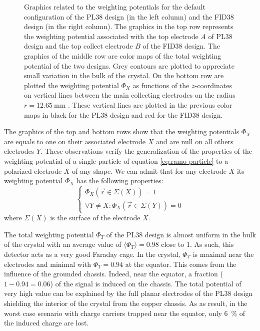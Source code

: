 \begin{figure}
\begin{minipage}{0.48\textwidth}
\end{minipage}
\caption{Graphics related to the weighting potentials for the default configuration of the PL38 design (in the left column) and the FID38 design (in the right column). The graphics in the top row represents the weighting potential associated with the top electrode $A$ of PL38 design and the top collect electrode $B$ of the FID38 design. The graphics of the middle row are color maps of the total weighting potential of the two designs. Grey contours are plotted to appreciate small variation in the bulk of the crystal. On the bottom row are plotted the weighting potential $\Phi_X$ as functions of the $z$-coordinates on vertical lines between the main collecting electrodes on the radius $r=\SI{12.65}{\mm}$ . These vertical lines are plotted in the previous color maps in black for the PL38 design and red for the FID38 design.}
\label{fig:pl38-fid38-weighting-potential}
\end{figure}

The graphics of the top and bottom rows show that the weighting potentials $\Phi_X$ are equals to one on their associated electrode $X$ and are null on all others electrodes $Y$. These observations verify the generalization of the properties of the weighting potential of a single particle of equation \ref{eq:ramo-particle} to a polarized electrode $X$ of any shape. We can admit that for any electrode $X$ its weighting potential $\Phi_X$ has the following properties:
\begin{equation}
\label{eq:ramo-electrode}
\begin{cases}
\Phi_X \left( \vec{r} \in \Sigma(X) \right) = 1 \\
\forall Y \neq X: \Phi_X \left( \vec{r} \in \Sigma(Y) \right) = 0
\end{cases}
\end{equation} 
where $\Sigma(X)$ is the surface of the electrode $X$.


The total weighting potential $\Phi_T$ of the PL38 design is almost uniform in the bulk of the crystal with an average value of $\langle \Phi_T \rangle = 0.98$ close to 1. As such, this detector acts as a very good Faraday cage. In the crystal, $\Phi_T$ is maximal near the electrodes and minimal with $\Phi_T = 0.94$ at the equator. This comes from the influence of the grounded chassis. Indeed, near the equator, a fraction ($1-0.94=0.06$) of the signal is induced on the chassis. The total potential of very high value can be explained by the full planar electrodes of the PL38 design shielding the interior of the crystal from the copper chassis. As as result, in the worst case scenario with charge carriers trapped near the equator, only \SI{6}{\percent} of the induced charge are lost.


